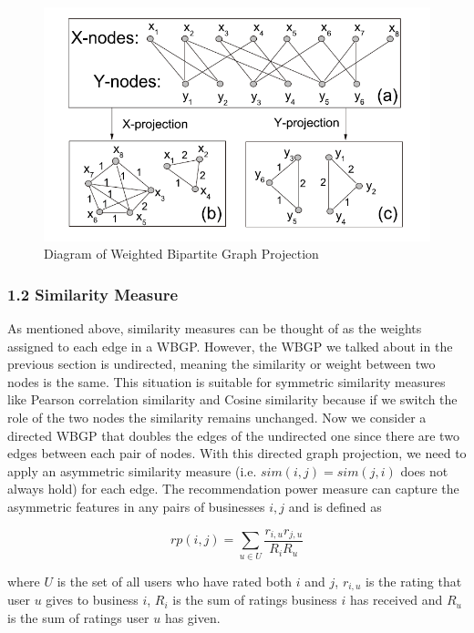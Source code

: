 \documentclass{article}
\begin{document}
\begin{figure}[H]
	\centering
	\includegraphics[width = .8\textwidth]{figs/figure1.png}
	\caption{Diagram of Weighted Bipartite Graph Projection} 
	\label{figure1}
\end{figure}





\subsubsection*{1.2  Similarity Measure}


\noindent As mentioned above, similarity measures can be thought of as the weights assigned 
to each edge in a WBGP. However, the WBGP we talked about in the previous section is undirected, 
meaning the similarity or weight between two nodes is the same. This situation is suitable for 
symmetric similarity measures like Pearson correlation similarity and Cosine similarity because 
if we switch the role of the two nodes the similarity remains unchanged. Now we consider a directed 
WBGP that doubles the edges of the undirected one since there are two edges between each pair of 
nodes. With this directed graph projection, we need to apply an asymmetric similarity measure 
(i.e. $sim(i, j) = sim(j, i)$ does not always hold) for each edge. The recommendation power measure 
can capture the asymmetric features in any pairs of businesses $i, j$ and is defined as

\begin{equation}
	rp\left ( i,j \right )=\sum_{u\in U}^{}\frac{r_{i,u}r_{j,u}}{R_{i}R_{u}}
\end{equation}


\noindent where $U$ is the set of all users who have rated both $i$ and $j$, $r_{i,u}$ is the rating that 
user $u$ gives to business $i$, $R_{i}$ is the sum of ratings business $i$ has received and $R_{u}$ is the sum of 
ratings user $u$ has given. 
\end{document}
